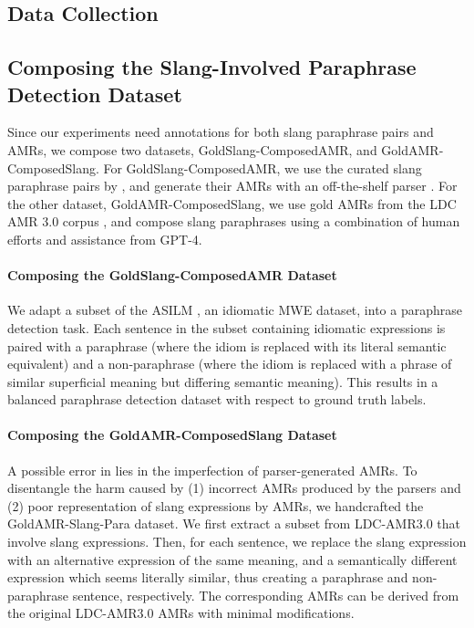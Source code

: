 \begin{enumerate}
\section{Data Collection}
\subsection{Composing the Slang-Involved Paraphrase Detection Dataset}\label{appd:slang_annot}

Since our experiments need annotations for both slang paraphrase pairs and AMRs, we compose two datasets, GoldSlang-ComposedAMR, and GoldAMR-ComposedSlang.
For GoldSlang-ComposedAMR, we use the curated slang paraphrase pairs by \citet{tayyar2021astitchinlanguagemodels}, and generate their AMRs with an off-the-shelf parser \cite{drozdov2022inducing}.
For the other dataset, GoldAMR-ComposedSlang, we use gold AMRs from the LDC AMR 3.0 corpus \cite{banarescu2013abstract}, and compose slang paraphrases using a combination of human efforts and assistance from GPT-4. 



\paragraph{Composing the GoldSlang-ComposedAMR Dataset}

We adapt a subset of the ASILM \cite{tayyar2021astitchinlanguagemodels}, an idiomatic MWE dataset, into a paraphrase detection task. Each sentence in the subset containing idiomatic expressions is paired with a paraphrase (where the idiom is replaced with its literal semantic equivalent) and a non-paraphrase (where the idiom is replaced with a phrase of similar superficial meaning but differing semantic meaning). This results in a balanced paraphrase detection dataset with respect to ground truth labels.

\paragraph{Composing the GoldAMR-ComposedSlang Dataset}

A possible error in \ourmodel lies in the imperfection of parser-generated AMRs.
To disentangle the harm caused by (1) incorrect AMRs produced by the parsers and (2) poor representation of slang expressions by AMRs, we handcrafted the GoldAMR-Slang-Para dataset. We first extract a subset from LDC-AMR3.0 \citep{banarescu2013abstract} that involve slang expressions. Then, for each sentence, we replace the slang expression with an alternative expression of the same meaning, and a semantically different expression which seems literally similar, thus creating a paraphrase and non-paraphrase sentence, respectively. The corresponding AMRs can be derived from the original LDC-AMR3.0 AMRs with minimal modifications.







\end{enumerate}
